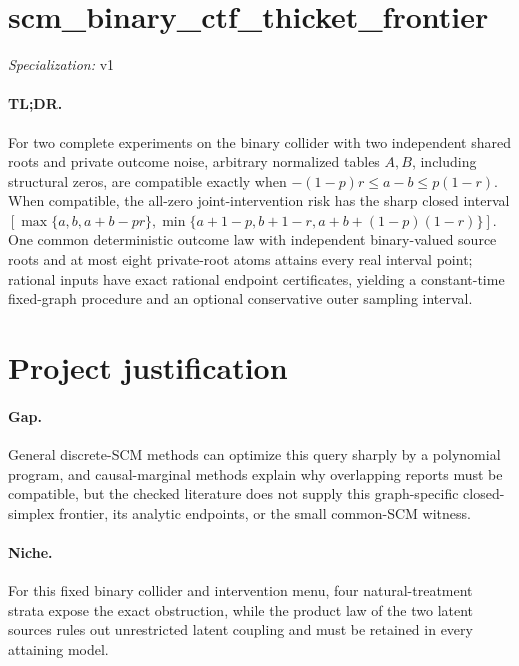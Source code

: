 \documentclass{article}
\begin{document}
\sloppy

\section*{scm\_\allowbreak{}binary\_\allowbreak{}ctf\_\allowbreak{}thicket\_\allowbreak{}frontier}

\noindent\textit{Specialization:} v1\par

\paragraph{TL;DR.} For two complete experiments on the binary collider with two independent shared roots and private outcome noise, arbitrary normalized tables \(A,B\), including structural zeros, are compatible exactly when \(-(1-p)r\le a-b\le p(1-r)\).  When compatible, the all-zero joint-intervention risk has the sharp closed interval \([\max\{a,b,a+b-pr\},\min\{a+1-p,b+1-r,a+b+(1-p)(1-r)\}]\).  One common deterministic outcome law with independent binary-valued source roots and at most eight private-root atoms attains every real interval point; rational inputs have exact rational endpoint certificates, yielding a constant-time fixed-graph procedure and an optional conservative outer sampling interval.

\section{Project justification}

\paragraph{Gap.} General discrete-SCM methods can optimize this query sharply by a polynomial program, and causal-marginal methods explain why overlapping reports must be compatible, but the checked literature does not supply this graph-specific closed-simplex frontier, its analytic endpoints, or the small common-SCM witness.

\paragraph{Niche.} For this fixed binary collider and intervention menu, four natural-treatment strata expose the exact obstruction, while the product law of the two latent sources rules out unrestricted latent coupling and must be retained in every attaining model.
\end{document}
